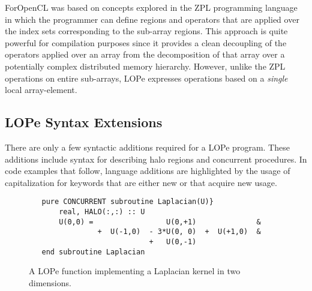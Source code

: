 ForOpenCL was based on concepts explored in the ZPL programming language~\cite{chamberlain04zpl} in
which the programmer can define regions and operators that are applied over the index sets
corresponding to the sub-array regions.  This approach is quite powerful for
compilation purposes since it provides a clean decoupling of the operators applied over an array
from the decomposition of that array over a potentially complex distributed memory hierarchy.
However, unlike the ZPL operations on entire sub-arrays, LOPe expresses operations based on
a \emph{single} local array-element.

%
%


\subsection{LOPe Syntax Extensions}

There are only a few syntactic additions required for a LOPe program.
These additions include syntax for describing halo regions and
concurrent procedures.  In code examples that follow,
language additions are highlighted by the usage of capitalization for
keywords that are either new or that acquire new usage.

\vspace{-.1in}

\begin{figure}
\begin{verbatim}
   pure CONCURRENT subroutine Laplacian(U)}
       real, HALO(:,:) :: U
       U(0,0) =                 U(0,+1)              &
                +  U(-1,0)  - 3*U(0, 0)  +  U(+1,0)  &
                            +   U(0,-1)
   end subroutine Laplacian
\end{verbatim}
\vspace{-.1in}
\caption{A LOPe function implementing a Laplacian kernel in two dimensions.}
\end{figure}

\vspace{-.3in}

